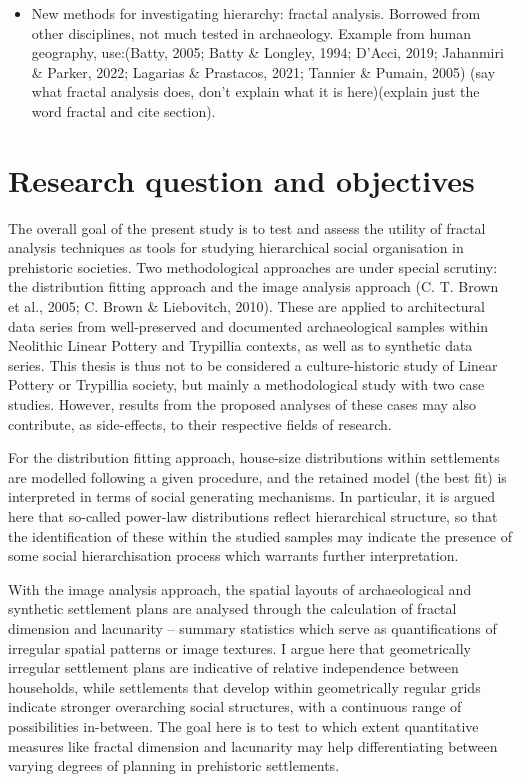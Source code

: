\documentclass[
  12pt,
]{book}
\begin{document}
\begin{itemize}
\item
  New methods for investigating hierarchy: fractal analysis. Borrowed from other disciplines, not much tested in archaeology. Example from human geography, use:(Batty, 2005; Batty \& Longley, 1994; D'Acci, 2019; Jahanmiri \& Parker, 2022; Lagarias \& Prastacos, 2021; Tannier \& Pumain, 2005) (say what fractal analysis does, don't explain what it is here)(explain just the word fractal and cite section).
\end{itemize}

\hypertarget{research-question-and-objectives}{%
\section{Research question and objectives}\label{research-question-and-objectives}}

The overall goal of the present study is to test and assess the utility of fractal analysis techniques as tools for studying hierarchical social organisation in prehistoric societies. Two methodological approaches are under special scrutiny: the distribution fitting approach and the image analysis approach (C. T. Brown et al., 2005; C. Brown \& Liebovitch, 2010). These are applied to architectural data series from well-preserved and documented archaeological samples within Neolithic Linear Pottery and Trypillia contexts, as well as to synthetic data series. This thesis is thus not to be considered a culture-historic study of Linear Pottery or Trypillia society, but mainly a methodological study with two case studies. However, results from the proposed analyses of these cases may also contribute, as side-effects, to their respective fields of research.

For the distribution fitting approach, house-size distributions within settlements are modelled following a given procedure, and the retained model (the best fit) is interpreted in terms of social generating mechanisms. In particular, it is argued here that so-called power-law distributions reflect hierarchical structure, so that the identification of these within the studied samples may indicate the presence of some social hierarchisation process which warrants further interpretation.

With the image analysis approach, the spatial layouts of archaeological and synthetic settlement plans are analysed through the calculation of fractal dimension and lacunarity -- summary statistics which serve as quantifications of irregular spatial patterns or image textures. I argue here that geometrically irregular settlement plans are indicative of relative independence between households, while settlements that develop within geometrically regular grids indicate stronger overarching social structures, with a continuous range of possibilities in-between. The goal here is to test to which extent quantitative measures like fractal dimension and lacunarity may help differentiating between varying degrees of planning in prehistoric settlements.
\end{document}
